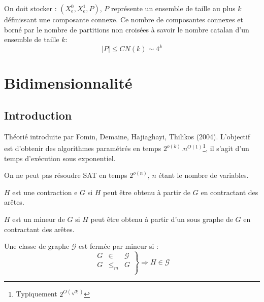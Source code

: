 \documentclass[a4paper, 11pt]{thesis}
\begin{document}
On doit stocker : $(X_e^0, X_e^1, P)$, $P$ représente un ensemble de taille au plus $k$ définissant
une composante connexe. Ce nombre de composantes connexes et borné par le nombre de partitions non
croisées à savoir le nombre catalan d'un ensemble de taille $k$:\begin{displaymath}
    |P| \leq CN(k) \sim 4^k
\end{displaymath}

\section{Bidimensionnalité}

\subsection{Introduction}

Théorié introduite par Fomin, Demaine, Hajiaghayi, Thilikos (2004).
L'objectif est d'obtenir des algorithmes paramétrés en temps
$2^{o(k)}.n^{O(1)}$\footnote{Typiquement $2^{O(\sqrt{k})}$}, il s'agit d'un
temps d'exécution sous exponentiel.

\begin{conj}
    On ne peut pas résoudre SAT en temps $2^{o(n)}$, $n$ étant le nombre de variables.
\end{conj}

\begin{rappel}
\end{rappel}

\begin{df}[$H \leq_c G$]
    $H$ est une contraction e $G$ si $H$ peut être obtenu à partir de $G$ en contractant des arêtes.
\end{df}

\begin{df}[$H \leq_m G$]
    $H$ est un mineur de $G$ si $H$ peut être obtenu à partir d'un sous graphe de $G$ en contractant
    des arêtes.
\end{df}

\begin{df}
    Une classe de graphe $\mathcal{G}$ est fermée par mineur si : \begin{displaymath}
        \left . \begin{array}{rcl}
            G & \in & \mathcal{G} \\
            G & \leq_m & G \\
        \end{array} \right \rbrace \Rightarrow H \in \mathcal{G}
    \end{displaymath}
\end{df}
\end{document}

